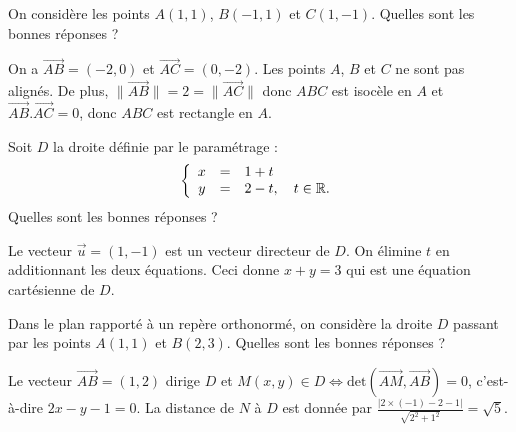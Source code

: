 \begin{question}
On considère les points $A(1,1)$, $B(-1,1)$ et $C(1,-1)$. Quelles sont les bonnes réponses ?
\begin{answers}  
\end{answers}
\begin{explanations}
On a $\overrightarrow{AB}=(-2,0)$ et $\overrightarrow{AC}=(0,-2)$. Les points $A$, $B$ et $C$ ne sont pas alignés. De plus, $\|\overrightarrow{AB}\|=2=\|\overrightarrow{AC}\|$ donc $ABC$ est isocèle en $A$ et $\overrightarrow{AB}.\overrightarrow{AC}=0$, donc $ABC$ est rectangle en $A$.
\end{explanations}
\end{question}


\begin{question}
Soit $D$ la droite définie par le paramétrage :
$$\left\{\begin{array}{ccl}x&=&1+t\\ y&=&2-t,\quad t\in \mathbb{R}.
\end{array}\right.$$
Quelles sont les bonnes réponses ?
\begin{answers}  
\end{answers}
\begin{explanations}
Le vecteur $\vec{u}=(1,-1)$ est un vecteur directeur de $D$. On élimine $t$ en additionnant les deux équations. Ceci donne $x+y=3$ qui est une équation cartésienne de $D$.
\end{explanations}
\end{question}



\begin{question}
Dans le plan rapporté à un repère orthonormé, on considère la droite $D$ passant par les points $A(1,1)$ et $B(2,3)$. Quelles sont les bonnes réponses ?
\begin{answers}  
\end{answers}
\begin{explanations}
Le vecteur $\overrightarrow{AB}=(1,2)$ dirige $D$ et $M(x,y)\in D\Leftrightarrow \mbox{det} \left(\overrightarrow{AM},\overrightarrow{AB}\right)=0$, c'est-à-dire $2x-y-1=0$. La distance de $N$ à $D$ est donnée par $\displaystyle \frac{|2\times (-1)-2-1|}{\sqrt{2^2+1^2}}=\sqrt{5}$.
\end{explanations}
\end{question}






